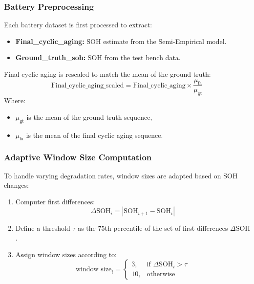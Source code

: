 \subsubsection{Battery Preprocessing}
Each battery dataset is first processed to extract:
\begin{itemize}
    \item \textbf{Final\_cyclic\_aging:} SOH estimate from the Semi-Empirical model.
    \item \textbf{Ground\_truth\_soh:} SOH from the test bench data.
\end{itemize}
Final cyclic aging is rescaled to match the mean of the ground truth:
\begin{equation}
    \text{Final\_cyclic\_aging\_scaled} = \text{Final\_cyclic\_aging} \times \frac{\mu_{\text{fa}}}{\mu_{\text{gt}}}
\end{equation}
Where:
\begin{itemize}
    \item $\mu_{\text{gt}}$ is the mean of the ground truth sequence,
    \item $\mu_{\text{fa}}$ is the mean of the final cyclic aging sequence.
\end{itemize}

\subsubsection{Adaptive Window Size Computation}
To handle varying degradation rates, window sizes are adapted based on SOH changes:
\begin{enumerate}
    \item Computer first differences: \begin{equation}
    \Delta \text{SOH}_i = \left| \text{SOH}_{i+1} - \text{SOH}_i \right|\end{equation}
    \item Define a threshold $\tau$ as the 75th percentile of the set of first differences $\Delta \text{SOH}$.
    \item Assign window sizes according to:
\begin{equation}
\text{window\_size}_i = 
\begin{cases}
3, & \text{if } \Delta \text{SOH}_i > \tau \\
10, & \text{otherwise}
\end{cases}
\end{equation}
\end{enumerate}

